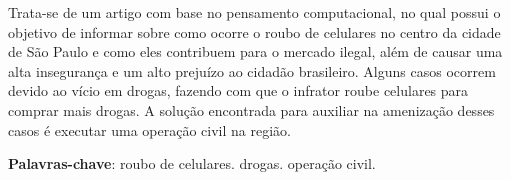 \documentclass[
	article,			
	11pt,				
	oneside,			
	a4paper,			
	english,			
	brazil,				
	sumario=tradicional
	]{abntex2}
\begin{document}
\frenchspacing 
\maketitle

\begin{resumoumacoluna}
    
    Trata-se de um artigo com base no pensamento computacional, no qual possui o objetivo de 
    informar sobre como ocorre o roubo de celulares no centro da cidade de São Paulo e como
    eles contribuem para o mercado ilegal, além de causar uma alta insegurança e um alto prejuízo ao
    cidadão brasileiro. Alguns casos ocorrem devido ao vício em drogas, fazendo com que o
    infrator roube celulares para comprar mais drogas. A solução encontrada para auxiliar na
    amenização desses casos é executar uma operação civil na região.
    
    \vspace{\onelineskip}
    
    \noindent
    \textbf{Palavras-chave}: roubo de celulares. drogas. operação civil.
\end{resumoumacoluna}

\textual

\newpage



\newpage



\newpage



\newpage



\newpage


\newpage

\end{document}
